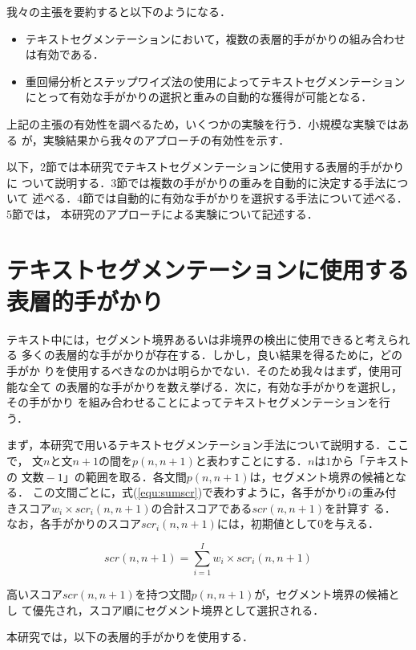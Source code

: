 我々の主張を要約すると以下のようになる．

\begin{itemize}
\item テキストセグメンテーションにおいて，複数の表層的手がかりの組み合わせ
は有効である．
\item 重回帰分析とステップワイズ法の使用によってテキストセグメンテーション
にとって有効な手がかりの選択と重みの自動的な獲得が可能となる．
\end{itemize}

上記の主張の有効性を調べるため，いくつかの実験を行う．小規模な実験ではある
が，実験結果から我々のアプローチの有効性を示す．

以下，2節では本研究でテキストセグメンテーションに使用する表層的手がかりに
ついて説明する．3節では複数の手がかりの重みを自動的に決定する手法について
述べる．4節では自動的に有効な手がかりを選択する手法について述べる．5節では，
本研究のアプローチによる実験について記述する．

\section{テキストセグメンテーションに使用する表層的手がかり}
\label{sec:cues}

テキスト中には，セグメント境界あるいは非境界の検出に使用できると考えられる
多くの表層的な手がかりが存在する．しかし，良い結果を得るために，どの手がか
りを使用するべきなのかは明らかでない．そのため我々はまず，使用可能な全て
の表層的な手がかりを数え挙げる．次に，有効な手がかりを選択し，その手がかり
を組み合わせることによってテキストセグメンテーションを行う．

まず，本研究で用いるテキストセグメンテーション手法について説明する．ここで，
文$n$と文$n+1$の間を$p(n,n+1)$と表わすことにする．$n$は$1$から「テキストの
$文数-1$」の範囲を取る．各文間$p(n,n+1)$は，セグメント境界の候補となる．
この文間ごとに，式(\ref{equ:sumscr})で表わすように，各手がかり$i$の重み付
きスコア$w_{i}\times scr_{i}(n,n+1)$の合計スコアである$scr(n,n+1)$を計算す
る．
なお，各手がかりのスコア$scr_{i}(n,n+1)$には，初期値として0を与える．

\begin{equation}\label{equ:sumscr}
	scr(n,n+1) = \sum_{i=1}^{I}w_{i} \times scr_{i}(n, n+1)
\end{equation}

高いスコア$scr(n,n+1)$を持つ文間$p(n,n+1)$が，セグメント境界の候補とし
て優先され，スコア順にセグメント境界として選択される．


本研究では，以下の表層的手がかりを使用する．


